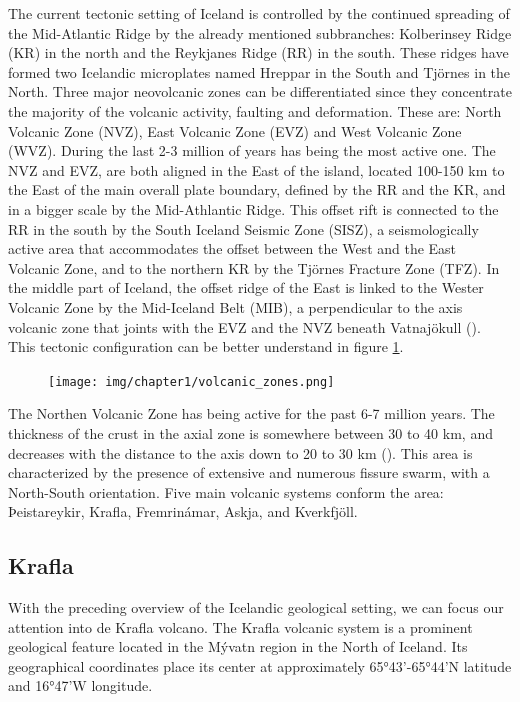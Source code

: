 The current tectonic setting of Iceland is controlled by the continued spreading of the Mid-Atlantic Ridge by the already mentioned subbranches: Kolberinsey Ridge (KR) in the north and the Reykjanes Ridge (RR) in the south. These ridges have formed two Icelandic microplates named Hreppar in the South and Tjörnes in the North. Three major neovolcanic zones can be differentiated since they concentrate the majority of the volcanic activity, faulting and deformation. These are: North Volcanic Zone (NVZ), East Volcanic Zone (EVZ) and West Volcanic Zone (WVZ). During the last 2-3 million of years has being the most active one. The NVZ and EVZ, are both aligned in the East of the island, located 100-150 km to the East of the main overall plate boundary, defined by the RR and the KR, and in a bigger scale by the Mid-Athlantic Ridge. This offset rift is connected to the RR in the south by the South Iceland Seismic Zone (SISZ), a seismologically active area that accommodates the offset between the West and the East Volcanic Zone, and to the northern KR by the Tjörnes Fracture Zone (TFZ). In the middle part of Iceland, the offset ridge of the East is linked to the Wester Volcanic Zone by the Mid-Iceland Belt (MIB), a perpendicular to the axis volcanic zone that joints with the EVZ and the NVZ beneath Vatnajökull (\cite{sigmundsson2006}). This tectonic configuration can be better understand in figure \ref{fig:iceland_map}.

\begin{figure}
    \centering
    \texttt{[image: img/chapter1/volcanic\_zones.png]}
    \caption{\cite{arnason2020}}
    \label{fig:iceland_map}
\end{figure}

The Northen Volcanic Zone has being active for the past 6-7 million years. The thickness of the crust in the axial zone is somewhere between 30 to 40 km, and decreases with the distance to the axis down to 20 to 30 km (\cite{björnsson1985}). This area is characterized by the presence of extensive and numerous fissure swarm, with a North-South orientation. Five main volcanic systems conform the area: Þeistareykir, Krafla, Fremrinámar, Askja, and Kverkfjöll.

\subsection{Krafla}
With the preceding overview of the Icelandic geological setting, we can focus our attention into de Krafla volcano. The Krafla volcanic system is a prominent geological feature located in the Mývatn region in the North of Iceland. Its geographical coordinates place its center at approximately 65°43'-65°44'N latitude and 16°47'W longitude. 


